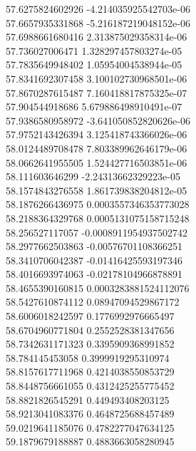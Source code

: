{57.6275824602926 -4.214035925542703e-06
 \\
57.6657935331868 -5.216187219048152e-06
 \\
57.6988661680416 2.313875029358314e-06
 \\
57.736027006471 1.328297457803274e-05
 \\
57.7835649948402 1.05954004538944e-05
 \\
57.8341692307458 3.100102730968501e-06
 \\
57.8670287615487 7.160418817875325e-07
 \\
57.904544918686 5.679886498910491e-07
 \\
57.9386580958972 -3.641050852820626e-06
 \\
57.9752143426394 3.125418743366026e-06
 \\
58.0124489708478 7.803389962646179e-06
 \\
58.0662641955505 1.524427716503851e-06
 \\
58.111603646299 -2.24313662329223e-05
 \\
58.1574843276558 1.861739838204812e-05
 \\
58.1876266436975 0.0003557346353773028
 \\
58.2188364329768 0.0005131075158715248
 \\
58.256527117057 -0.0008911954937502742
 \\
58.2977662503863 -0.00576701108366251
 \\
58.3410706042387 -0.01416425593197346
 \\
58.4016693974063 -0.02178104966878891
 \\
58.4655390160815 0.0003283881524112076
 \\
58.5427610874112 0.08947094529867172
 \\
58.6006018242597 0.1776992976665497
 \\
58.6704960771804 0.2552528381347656
 \\
58.7342631171323 0.3395909368991852
 \\
58.784145453058 0.3999919295310974
 \\
58.8157617711968 0.4214038550853729
 \\
58.8448756661055 0.4312425255775452
 \\
58.8821826545291 0.449493408203125
 \\
58.9213041083376 0.4648725688457489
 \\
59.0219641185076 0.4782277047634125
 \\
59.1879679188887 0.4883663058280945
 \\
}
